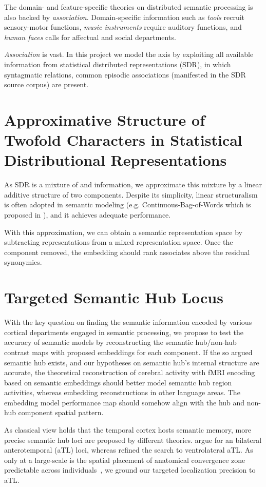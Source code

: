 The domain- and feature-specific theories on distributed semantic processing is also backed by \emph{association}. Domain-specific information such as \emph{tools} recruit sensory-motor functions, \emph{music instruments} require auditory functions, and \emph{human faces} calls for affectual and social departments. 

\emph{Association} is vast. In this project we model the \association axis by exploiting all available information from statistical distributed representations (SDR), in which syntagmatic relations, common episodic associations (manifested in the SDR source corpus) are present.

\section{Approximative Structure of Twofold Characters in Statistical Distributional Representations}

\label{subsection:hyplinearsemantics}
As SDR is a mixture of \similarity and \association information, we approximate this mixture by a linear additive structure of two components. Despite its simplicity, linear structuralism is often adopted in semantic modeling (e.g. Continuous-Bag-of-Words which is proposed in \textcite{mikolovEfficientEstimationWord2013}), and it achieves adequate performance. 

With this approximation, we can obtain a semantic \association representation space by subtracting \similarity representations from a mixed representation space. Once the \similarity component removed, the embedding should rank associates above the residual synonymies.

\section{Targeted Semantic Hub Locus}

With the key question on finding the semantic information encoded by various cortical departments engaged in semantic processing, we propose to test the accuracy of semantic models by reconstructing the semantic hub\slash non-hub contrast maps with proposed embeddings for each component. If the so argued semantic hub exists, and our hypotheses on semantic hub's internal structure are accurate, the theoretical reconstruction of cerebral activity with fMRI encoding based on semantic \similarity embeddings should better model semantic hub region activities, whereas \association embedding reconstructions in other language areas. The embedding model performance map should somehow align with the hub and non-hub component spatial pattern.

As classical view holds that the temporal cortex hosts semantic memory, more precise semantic hub loci are proposed by different theories. \textcite{priceMetaanalysesObjectNaming2005, pattersonWhereYouKnow2007, binderMappingAnteriorTemporal2011} argue for an bilateral anterotemporal (aTL) loci, whereas \textcite{ralphNeuralComputationalBases2017} refined the search to ventrolateral aTL. As only at a large-scale is the spatial placement of anatomical convergence zone predictable across individuals~\parencite{damasioNeuralSystemsWord2004}, we ground our targeted localization precision to aTL.